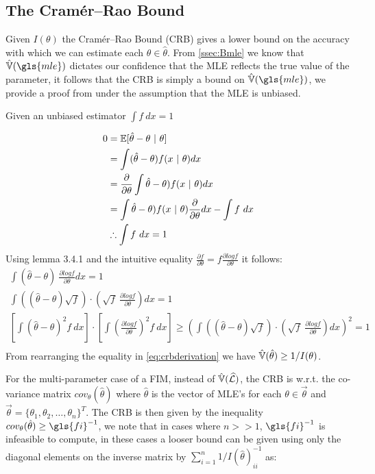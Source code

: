 \subsection{The Cramér–Rao Bound}
\label{ssec:Bcrb}

Given $I(\theta)$ the Cramér–Rao Bound (CRB) gives a lower bound on the accuracy with which we can estimate each $\theta\in\hat\theta$. From \cref{ssec:Bmle} we know that $\VAR(\gls{mle})$ dictates our confidence that the MLE reflects the true value of the parameter, it follows that the CRB is simply a bound on $\VAR(\gls{mle})$, we provide a proof from \cite{trees_detection_2013} under the assumption that the MLE is unbiased.
\begin{lemma}\label{lem:dx1}
Given an unbiased estimator $\int f\ dx=1$ 
\end{lemma}
\begin{align*}
    0 &= \EX[\hat\theta - \theta\ |\ \theta]\\
    &= \int (\hat\theta - \theta) f(x\ |\ \theta)dx\\
    &= \frac{\partial}{\partial\theta}\int \hat\theta - \theta) f(x\ |\ \theta)dx\\
    &= \int \hat\theta - \theta) f(x\ |\ \theta)\frac{\partial}{\partial\theta}dx-\int f\ dx\\
    &\therefore \int f\ dx = 1
\end{align*}
Using lemma 3.4.1 and the intuitive equality $\frac{\partial f}{\partial\theta} = f\frac{\partial log f}{\partial\theta}$ it follows:
\begin{equation}\label{eq:crbderivation}
\begin{aligned}
    \int(\hat\theta-\theta)\ \frac{\partial logf}{\partial\theta}dx = 1\\
    \int((\hat\theta-\theta)\sqrt{f})\cdot\left(\sqrt{f}\ \frac{\partial logf}{\partial\theta}\right) dx = 1\\
    \left[\int(\hat\theta -\theta)^2 f\ dx\right]\cdot
    \left[\int\left(\frac{\partial logf}{\partial\theta}\right)^2 f\ dx\right] \geq
    \left(\int((\hat\theta-\theta)\sqrt{f})\cdot
    \left(\sqrt{f}\ \frac{\partial logf}{\partial\theta}\right) dx\right)^2 = 1\\
\end{aligned}
\end{equation}
From rearranging the equality in \cref{eq:crbderivation} we have $\operatorname{\hat{\mathbb{V}}}(\hat\theta) \geq 1/I(\theta)$.\par
For the multi-parameter case of a FIM, instead of $\operatorname{\hat{\mathbb{V}}}(\widehat{\mathcal{L}})$, the CRB is w.r.t. the co-variance matrix $cov_\theta(\hat\theta)$ where $\hat\theta$ is the vector of MLE's for each  $\theta\in\vec{\theta}$ and $\vec{\theta}=\{\theta_1,\theta_2,\ldots,\theta_n\}^T$. The CRB is then given by the inequality $cov_\theta(\hat\theta)\geq \gls{fi}^{-1}$, we note that in cases where $n>>1$, $\gls{fi}^{-1}$ is infeasible to compute, in these cases a looser bound can be given using only the diagonal elements on the inverse matrix by $\sum_{i=1}^n 1/I(\hat\theta)_{ii}^{-1}$ as:
